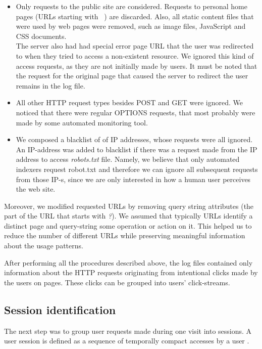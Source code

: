 \documentclass[12pt, english,a4paper]{article}
\begin{document}
\begin{itemize}
\item Only requests to the public site are considered. Requests to personal home pages (URLs starting with ~) are discarded. Also, all static content files that were used by web pages were removed, such as image files, JavaScript and CSS documents. \\ The server also had had special error page URL that the user was redirected to when they tried to access a non-existent resource. We ignored this kind of access requests, as they are not initially made by users. It must be noted that the request for the original page that caused the server to redirect the user remains in the log file.
  
\item All other HTTP request types besides POST and GET were ignored. We noticed that there were regular OPTIONS requests, that most probably were made by some automated monitoring tool. 
  
\item We composed a blacklist of of IP addresses, whose requests were all ignored. An IP-address was added to blacklist if there was a request made from the IP address to access \emph{robots.txt} file. Namely, we believe that only automated indexers request robot.txt and therefore we can ignore all subsequent requests from those IP-s, since we are only interested in how a human user perceives the web site. 
\end{itemize}


Moreover, we modified requested URLs by removing query string attributes (the part of the URL that starts with \emph{?}). We assumed that typically URLs identify a distinct page and query-string some operation or action on it. This helped us to reduce the number of different URLs while preserving meaningful information about the usage patterns.

After performing all the procedures described above, the log files contained only information about the HTTP requests originating from intentional clicks made by the users on pages. These clicks can be grouped into users' click-streams.











\subsection{Session identification}
The next step was to group user requests made during one visit into sessions. A user session is defined as a sequence of temporally compact accesses by a user \cite{on_mining_logs}.
\end{document}
